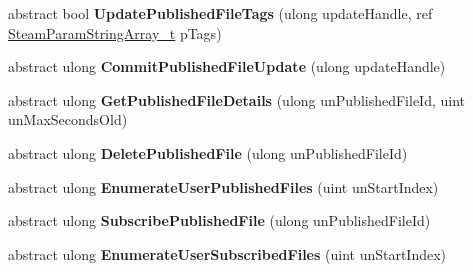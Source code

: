 \begin{DoxyCompactItemize}
\item 
\hypertarget{classValve_1_1Steamworks_1_1ISteamRemoteStorage_a38818e94485c824f411240816944b3ce}{}abstract bool {\bfseries Update\+Published\+File\+Tags} (ulong update\+Handle, ref \hyperlink{structValve_1_1Steamworks_1_1SteamParamStringArray__t}{Steam\+Param\+String\+Array\+\_\+t} p\+Tags)\label{classValve_1_1Steamworks_1_1ISteamRemoteStorage_a38818e94485c824f411240816944b3ce}

\item 
\hypertarget{classValve_1_1Steamworks_1_1ISteamRemoteStorage_a938554afb76445e0e09a94e18460ed1d}{}abstract ulong {\bfseries Commit\+Published\+File\+Update} (ulong update\+Handle)\label{classValve_1_1Steamworks_1_1ISteamRemoteStorage_a938554afb76445e0e09a94e18460ed1d}

\item 
\hypertarget{classValve_1_1Steamworks_1_1ISteamRemoteStorage_a14864fd24318aa4f3cd907bd219a3127}{}abstract ulong {\bfseries Get\+Published\+File\+Details} (ulong un\+Published\+File\+Id, uint un\+Max\+Seconds\+Old)\label{classValve_1_1Steamworks_1_1ISteamRemoteStorage_a14864fd24318aa4f3cd907bd219a3127}

\item 
\hypertarget{classValve_1_1Steamworks_1_1ISteamRemoteStorage_aa8a1fe3fdd3ccc500b3898d3fc88fc78}{}abstract ulong {\bfseries Delete\+Published\+File} (ulong un\+Published\+File\+Id)\label{classValve_1_1Steamworks_1_1ISteamRemoteStorage_aa8a1fe3fdd3ccc500b3898d3fc88fc78}

\item 
\hypertarget{classValve_1_1Steamworks_1_1ISteamRemoteStorage_a66fef2863f2efa34128813ac9e51a4e6}{}abstract ulong {\bfseries Enumerate\+User\+Published\+Files} (uint un\+Start\+Index)\label{classValve_1_1Steamworks_1_1ISteamRemoteStorage_a66fef2863f2efa34128813ac9e51a4e6}

\item 
\hypertarget{classValve_1_1Steamworks_1_1ISteamRemoteStorage_a8cd0c80c658598cb9f3f513292956207}{}abstract ulong {\bfseries Subscribe\+Published\+File} (ulong un\+Published\+File\+Id)\label{classValve_1_1Steamworks_1_1ISteamRemoteStorage_a8cd0c80c658598cb9f3f513292956207}

\item 
\hypertarget{classValve_1_1Steamworks_1_1ISteamRemoteStorage_a2f0dd4bb467db43353090f0b0867f0be}{}abstract ulong {\bfseries Enumerate\+User\+Subscribed\+Files} (uint un\+Start\+Index)\label{classValve_1_1Steamworks_1_1ISteamRemoteStorage_a2f0dd4bb467db43353090f0b0867f0be}


\end{DoxyCompactItemize}
